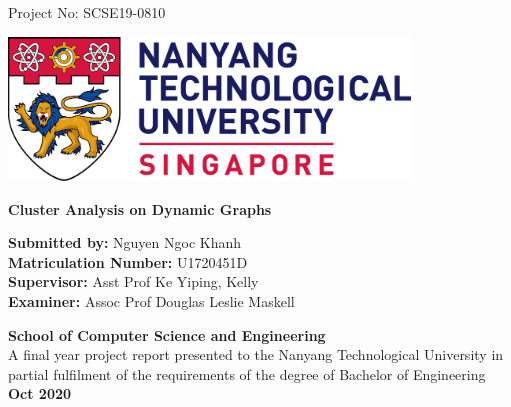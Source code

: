 \begin{titlepage}
\begin{center}
\begin{flushright}
Project No: SCSE19-0810
\end{flushright}
\vspace{1cm}

\includegraphics[width=0.8\textwidth]{report/assets/ntu_logo.png}

\vspace{2cm}

\textbf{{\large Cluster Analysis on Dynamic Graphs}}

\vspace{2.5cm}

\textbf{Submitted by:} Nguyen Ngoc Khanh \\
\textbf{Matriculation Number:} U1720451D \\

\vspace{0.5cm}
\textbf{Supervisor:} Asst Prof Ke Yiping, Kelly \\
\textbf{Examiner:} Assoc Prof Douglas Leslie Maskell \\



\vfill

\textbf{School of Computer Science and Engineering}\\

\vspace{0.5cm}
A final year project report presented to the Nanyang Technological University in partial fulfilment of the requirements of the degree of Bachelor of Engineering\\
\vspace{0.5cm}
\textbf{Oct 2020}

\end{center}
\end{titlepage}
